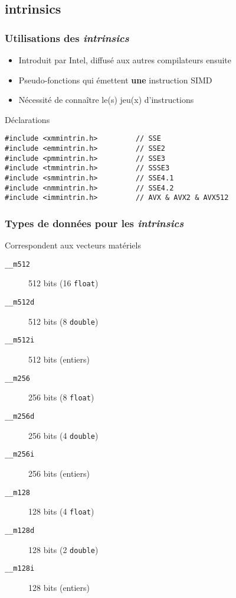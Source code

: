 \documentclass[xcolor={x11names,svgnames}]{beamer}
\begin{document}
\subsection{intrinsics}

\begin{frame}[fragile=singleslide]
  \frametitle{Utilisations des \emph{intrinsics}}

  \begin{itemize}
  \item Introduit par Intel, diffusé aux autres compilateurs ensuite
  \item Pseudo-fonctions qui émettent \textbf{une} instruction SIMD
  \item Nécessité de connaître le(s) jeu(x) d'instructions
  \end{itemize}
  
  
\begin{block}{Déclarations}
  \begin{verbatim}
#include <xmmintrin.h>         // SSE
#include <emmintrin.h>         // SSE2
#include <pmmintrin.h>         // SSE3
#include <tmmintrin.h>         // SSSE3
#include <smmintrin.h>         // SSE4.1
#include <nmmintrin.h>         // SSE4.2
#include <immintrin.h>         // AVX & AVX2 & AVX512
\end{verbatim}
\end{block}

\end{frame}


\begin{frame}[fragile=singleslide]
  \frametitle{Types de données pour les \emph{intrinsics}}

\begin{block}{Correspondent aux \og vecteurs\fg{} matériels}
  
  \begin{description}
\item[\texttt{\_\_m512}] 512 bits (16 \texttt{float})
\item[\texttt{\_\_m512d}] 512 bits (8 \texttt{double})
\item[\texttt{\_\_m512i}] 512 bits (entiers)

  \item[\texttt{\_\_m256}] 256 bits (8 \texttt{float})
\item[\texttt{\_\_m256d}] 256 bits (4 \texttt{double})
\item[\texttt{\_\_m256i}] 256 bits (entiers)

\item[\texttt{\_\_m128}] 128 bits (4 \texttt{float})
\item[\texttt{\_\_m128d}] 128 bits (2 \texttt{double})
\item[\texttt{\_\_m128i}] 128 bits (entiers)
\end{description}
\end{block}
\end{frame}
\end{document}
